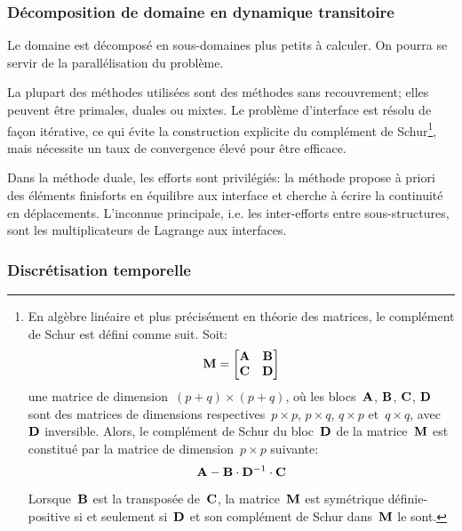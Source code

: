 \medskip
\subsubsection{Décomposition de domaine en dynamique transitoire}\label{Sec-Schur}

Le domaine est décomposé en sous-domaines plus petits à calculer.
On pourra se servir de la parallélisation du problème.

La plupart des méthodes utilisées sont des méthodes sans recouvrement; elles
peuvent être primales, duales ou mixtes. Le problème d'interface est résolu
de façon itérative, ce qui évite la construction explicite du complément
de Schur\footnote{%
En algèbre linéaire et plus précisément en théorie des matrices, le complément de
Schur est défini comme suit. Soit:
\begin{equation} \MM{M}=\MM*{\MM{A} & \MM{B} \\ \MM{C} & \MM{D}} \end{equation}
une matrice de dimension~$(p+q)\times(p+q)$, où les blocs~$\MM{A}$, $\MM{B}$, $\MM{C}$, $\MM{D}$ sont des matrices
de dimensions respectives~$p\times p$, $p\times q$, $q\times p$ et~$q\times q$, avec~$\MM{D}$ inversible.
Alors, le complément de Schur du bloc~$\MM{D}$ de la matrice~$\MM{M}$ est constitué par la matrice
de dimension~$p\times p$ suivante:
\begin{equation} \MM{A} - \MM{B}\cdot \MMI{D}\cdot \MM{C}\end{equation}

Lorsque~$\MM{B}$ est la transposée de~$\MM{C}$, la matrice~$\MM{M}$ est symétrique définie-positive
si et seulement si~$\MM{D}$ et son complément de Schur dans~$\MM{M}$ le sont.
}, mais nécessite un taux de convergence élevé pour être
efficace.

Dans la méthode duale, les efforts sont privilégiés: la méthode propose
à priori des éléments finisforts en équilibre aux interface et cherche à écrire la continuité
en déplacements. L'inconnue principale, i.e. les inter-efforts entre sous-structures,
sont les multiplicateurs de Lagrange aux interfaces.

\medskip
\subsubsection{Discrétisation temporelle}


